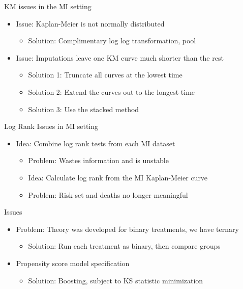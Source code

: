 \begin{frame}{KM issues in the MI setting}
\begin{itemize}
\item Issue: Kaplan-Meier is not normally distributed
  \begin{itemize}
   \item Solution: Complimentary log log transformation, pool \cite{Marshall2009}
  \end{itemize}
  \item Issue: Imputations leave one KM curve much shorter than the rest
  \begin{itemize}
   \item Solution 1: Truncate all curves at the lowest time
   \item Solution 2: Extend the curves out to the longest time
   \item Solution 3: Use the stacked method
  \end{itemize}

\end{itemize}
\end{frame}

\begin{frame}{Log Rank Issues in MI setting}
\begin{itemize}
  \item Idea: Combine log rank tests from each MI dataset
  \begin{itemize}
  \item Problem: Wastes information and is unstable \cite{Marshall2009}
  \item Idea: Calculate log rank from the MI Kaplan-Meier curve
  \item Problem: Risk set and deaths no longer meaningful
  \end{itemize}
\end{itemize}
\end{frame}

\begin{frame}{Issues}
\begin{itemize}
 \item Problem: Theory was developed for binary treatments, we have ternary
 \begin{itemize}
  \item Solution: Run each treatment as binary, then compare groups
 \end{itemize}
\item Propensity score model specification
\begin{itemize}
 \item Solution: Boosting, subject to KS statistic minimization
\end{itemize}
\end{itemize}
 
\end{frame}

